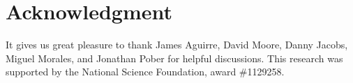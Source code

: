 \documentclass[twocolumn,apj,numberedappendix]{emulateapj}
\begin{document}
\section{Acknowledgment}

It gives us great pleasure to thank James Aguirre, David Moore, Danny Jacobs, 
Miguel Morales, and Jonathan Pober for helpful discussions.  This research
was supported by the National Science Foundation, award \#1129258.




\end{document}
